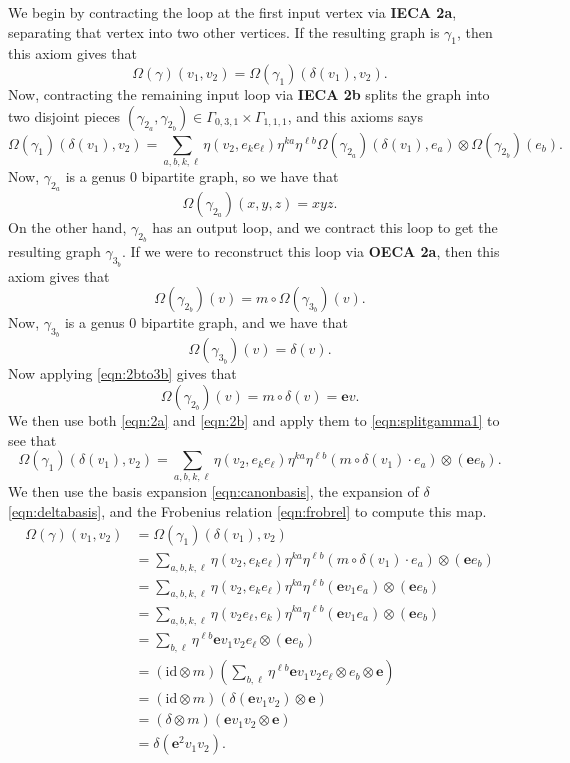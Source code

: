 \documentclass{amsart}
\newcommand{\be}{\begin{equation}}
\newcommand{\ee}{\end{equation}}
\newcommand{\tensor}{\otimes}
\newcommand{\id}{\mathrm{id}}
\newcommand{\eul}{\mathbf{e}}
\theoremstyle{definition}
\begin{document}
\noindent We begin by contracting the loop at the first input vertex via \textbf{IECA 2a}, separating that vertex into two other vertices. If the resulting graph is $\gamma_1$, then this axiom gives that
\be
\Omega(\gamma)(v_1,v_2)=\Omega(\gamma_1)(\delta(v_1),v_2).
\ee
\noindent Now, contracting the remaining input loop via \textbf{IECA 2b} splits the graph into two disjoint pieces $(\gamma_{2_a}, \gamma_{2_b})\in\Gamma_{0,3,1}\times\Gamma_{1,1,1}$, and this axioms says
\be\label{eqn:splitgamma1}
\Omega(\gamma_1)(\delta(v_1),v_2)=\sum_{a,b,k,\ell}\eta(v_2,e_ke_\ell)\eta^{ka}\eta^{\ell b}\Omega(\gamma_{2_a})(\delta(v_1),e_a)\tensor \Omega(\gamma_{2_b})(e_b).
\ee
\noindent Now, $\gamma_{2_a}$ is a genus 0 bipartite graph, so we have that \be\label{eqn:2a}
\Omega(\gamma_{2_a})(x,y,z)=xyz.
\ee
\noindent On the other hand, $\gamma_{2_b}$ has an output loop, and we contract this loop to get the resulting graph $\gamma_{3_b}$. If we were to reconstruct this loop via \textbf{OECA 2a}, then this axiom gives that
\be\label{eqn:2bto3b}
\Omega(\gamma_{2_b})(v)=m\circ \Omega(\gamma_{3_b})(v).
\ee
\noindent Now, $\gamma_{3_b}$ is a genus 0 bipartite graph, and we have that 
\be
\Omega(\gamma_{3_b})(v)=\delta(v).
\ee
\noindent Now applying \ref{eqn:2bto3b} gives that 
\be\label{eqn:2b}
\Omega(\gamma_{2_b})(v)=m\circ \delta(v)=\eul v.
\ee
We then use both \ref{eqn:2a} and \ref{eqn:2b} and apply them to \ref{eqn:splitgamma1} to see that 
\be
\Omega(\gamma_1)(\delta(v_1),v_2)=\sum_{a,b,k,\ell}\eta(v_2,e_ke_\ell)\eta^{ka}\eta^{\ell b}(m\circ\delta(v_1)\cdot e_a)\tensor(\eul e_b).
\ee
We then use the basis expansion \ref{eqn:canonbasis}, the expansion of $\delta$ \ref{eqn:deltabasis}, and the Frobenius relation \ref{eqn:frobrel} to compute this map.
\begin{align*}
    \Omega(\gamma)(v_1,v_2)&=\Omega(\gamma_1)(\delta(v_1),v_2)\\
    &=\sum_{a,b,k,\ell}\eta(v_2,e_ke_\ell)\eta^{ka}\eta^{\ell b}(m\circ\delta(v_1)\cdot e_a)\tensor(\eul e_b)\\
    &=\sum_{a,b,k,\ell}\eta(v_2,e_ke_\ell)\eta^{ka}\eta^{\ell b}(\eul v_1e_a)\tensor(\eul e_b)\\
    &=\sum_{a,b,k,\ell}\eta(v_2e_\ell,e_k)\eta^{ka}\eta^{\ell b}(\eul v_1e_a)\tensor(\eul e_b)\\
    &=\sum_{b,\ell}\eta^{\ell b}\eul v_1v_2e_\ell\tensor(\eul e_b)\\
    &=(\id\tensor m)\left(\sum_{b,\ell}\eta^{\ell b}\eul v_1v_2e_\ell\tensor e_b\tensor \eul\right)\\
    &=(\id\tensor m)(\delta(\eul v_1v_2)\tensor \eul)\\
    &=(\delta\tensor m)(\eul v_1v_2\tensor \eul)\\
    &=\delta(\eul^2 v_1v_2).
\end{align*}
\end{document}
